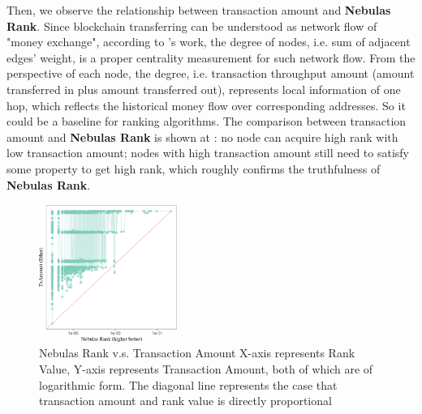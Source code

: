 Then, we observe the relationship between transaction amount and \textbf{Nebulas Rank}. Since blockchain transferring can be understood as network flow of "money exchange", according to \textcite{Borgatti2005}'s work, the degree of nodes, i.e. sum of adjacent edges' weight, is a proper centrality measurement for such network flow. From the perspective of each node, the degree, i.e. transaction throughput amount (amount transferred in plus amount transferred out), represents local information of one hop, which reflects the historical money flow over corresponding addresses. So it could be a baseline for ranking algorithms. The comparison between transaction amount and \textbf{Nebulas Rank} is shown at : no node can acquire high rank with low transaction amount; nodes with high transaction amount still need to satisfy some property to get high rank, which roughly confirms the truthfulness of \textbf{Nebulas Rank}.
\begin{figure}[!htbp]
	\centering
	\includegraphics[width=0.40\textwidth]{figs/MAY_lr.png}
	\caption{Nebulas Rank v.s. Transaction Amount \small{X-axis represents Rank Value, Y-axis represents Transaction Amount, both of which are of logarithmic form.  The diagonal line represents the case that transaction amount and rank value is directly proportional}}\label{fig:nrio}
\end{figure}

